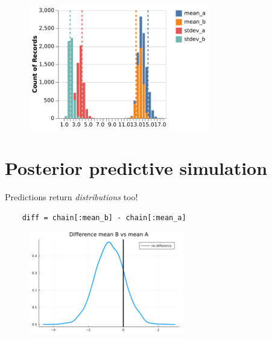\documentclass[aspectratio=169,xcolor=svgnames]{beamer}
\begin{document}
\begin{frame}
  \begin{figure}[ht]
    \centering
    \includegraphics[width=0.7\textwidth]{figures/plot_a_b_parameters.pdf}
  \end{figure}
\end{frame}

\section{Posterior predictive simulation}

\begin{frame}
  \huge
  \center
  Predictions return \emph{distributions} too!
\end{frame}

\begin{frame}[fragile]
  \begin{verbatim}
    diff = chain[:mean_b] - chain[:mean_a]
  \end{verbatim}

  \begin{figure}[ht]
    \centering
    \includegraphics[width=0.6\textwidth]{figures/plot_difference_a_b.pdf}
  \end{figure}
\end{frame}
\end{document}
